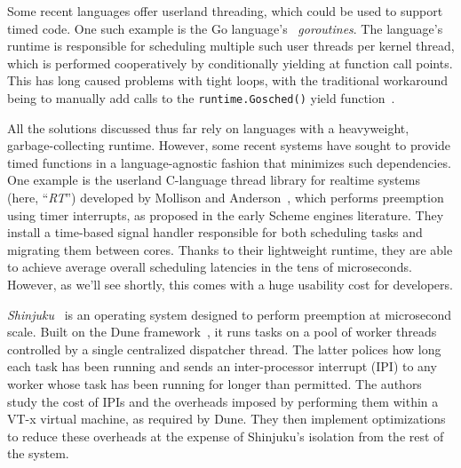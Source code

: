 Some recent languages offer userland threading, which could be used to support timed
code.  One such example is the Go language's~\cite{www-golang} \textit{goroutines}.
The language's runtime is responsible for scheduling multiple such user
threads per kernel thread, which is performed cooperatively by conditionally yielding
at function call points.  This has long caused problems with tight loops, with the
traditional workaround being to manually add calls to the \texttt{runtime.Gosched()}
yield function~\cite{www-golang-tightloop}.

All the solutions discussed thus far rely on languages with a heavyweight,
garbage-collecting runtime.  However, some recent systems have sought
to provide timed functions in a language-agnostic fashion that minimizes such
dependencies.  One example is the userland C-language thread library for realtime
systems (here, ``\textit{RT}'') developed by Mollison and
Anderson~\cite{mollison:rtas2013}, which performs
preemption using timer interrupts, as proposed in the early Scheme engines
literature.  They install a time-based signal handler responsible for both scheduling
tasks and migrating them between cores.  Thanks to their lightweight runtime, they
are able to achieve average overall scheduling latencies in the tens of microseconds.
However, as we'll see shortly, this comes with a huge usability cost for developers.

\textit{Shinjuku}~\cite{Kaffes:nsdi2019} is an operating system designed to perform
preemption at microsecond scale.  Built on the Dune framework~\cite{Belay:osdi2012},
it runs tasks on a pool of worker threads controlled by a single centralized
dispatcher thread.  The latter polices how long each task has been running and
sends an inter-processor interrupt (IPI) to any worker whose task has been running
for longer than permitted.  The authors study the cost of IPIs and the overheads
imposed by performing them within a VT-x virtual machine, as required by Dune.  They
then implement optimizations to reduce these overheads at the expense of Shinjuku's
isolation from the rest of the system.

